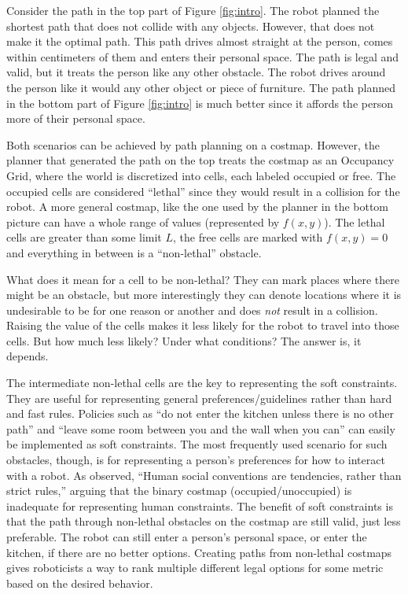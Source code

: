 Consider the path in the top part of Figure \ref{fig:intro}. The robot planned the shortest path that does not collide with any objects. However, that does not make it the optimal path. This path drives almost straight at the person, comes within centimeters of them and enters their personal space. The path is legal and valid, but it treats the person like any other obstacle. The robot drives around the person like it would any other object or piece of furniture. The path planned in the bottom part of Figure \ref{fig:intro} is much better since it affords the person more of their personal space. 

Both scenarios can be achieved by path planning on a costmap. However, the planner that generated the path on the top treats the costmap as an Occupancy Grid\cite{matthies1988}, where the world is discretized into cells, each labeled occupied or free. The occupied cells are considered ``lethal'' since they would result in a collision for the robot. A more general costmap, like the one used by the planner in the bottom picture can have a whole range of values (represented by $f(x,y)$). The lethal cells are greater than some limit $L$, the free cells are marked with $f(x,y)=0$ and everything in between is a ``non-lethal'' obstacle. 

What does it mean for a cell to be non-lethal? They can mark places where there might be an obstacle, but more interestingly they can denote locations where it is undesirable to be for one reason or another and does \emph{not} result in a collision. Raising the value of the cells makes it less likely for the robot to travel into those cells. But how much less likely? Under what conditions? The answer is, it depends. 

The intermediate non-lethal cells are the key to representing the soft constraints. They are useful for representing general preferences/guidelines rather than hard and fast rules. Policies such as ``do not enter the kitchen unless there is no other path'' and ``leave some room between you and the wall when you can'' can easily be implemented as soft constraints. The most frequently used scenario for such obstacles, though, is for representing a person's preferences for how to interact with a robot. As \citet{kirby:companion} observed, ``Human social conventions are tendencies, rather than strict rules,'' arguing that the binary costmap (occupied/unoccupied) is inadequate for representing human constraints. The benefit of soft constraints is that the path through non-lethal obstacles on the costmap are still valid, just less preferable. The robot can still enter a person's personal space, or enter the kitchen, if there are no better options. Creating paths from non-lethal costmaps gives roboticists a way to rank multiple different legal options for some metric based on the desired behavior. 

